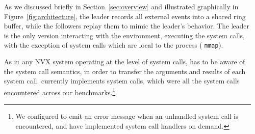 As we discussed briefly in Section~\ref{sec:overview} and illustrated
graphically in Figure~\ref{fig:architecture}, the leader records all
external events into a shared ring buffer, while the followers replay
them to mimic the leader's behavior. The leader is the only version
interacting with the environment, \ie executing the system calls, with
the exception of system calls which are local to the process (\eg
\lstinline`mmap`). %

As in any NVX system operating at the level of system calls, \varan
has to be aware of the system call semantics, in order to transfer the
arguments and results of each system call.  \varan currently
implements \syscallsHandlers system calls, which were all the system
calls encountered across our benchmarks.\footnote{We configured \varan
  to emit an error message when an unhandled system call is
  encountered, and have implemented system call handlers on demand.}







